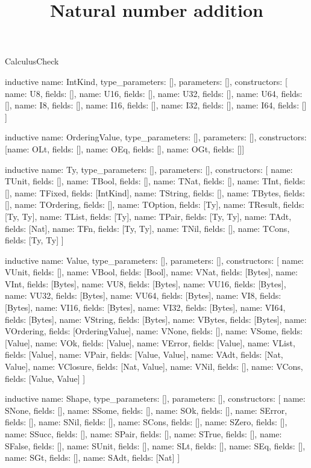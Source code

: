 \begin{lexlean}{CalculusCheck}
\title{Natural number addition}
\begin{semanticmodule}
inductive{
  name: IntKind,
  type_parameters: [],
  parameters: [],
  constructors: [
    {name: U8, fields: []},
    {name: U16, fields: []},
    {name: U32, fields: []},
    {name: U64, fields: []},
    {name: I8, fields: []},
    {name: I16, fields: []},
    {name: I32, fields: []},
    {name: I64, fields: []}
  ]
}

inductive{
  name: OrderingValue,
  type_parameters: [],
  parameters: [],
  constructors: [{name: OLt, fields: []}, {name: OEq, fields: []}, {name: OGt, fields: []}]
}

inductive{
  name: Ty,
  type_parameters: [],
  parameters: [],
  constructors: [
    {name: TUnit, fields: []},
    {name: TBool, fields: []},
    {name: TNat, fields: []},
    {name: TInt, fields: []},
    {name: TFixed, fields: [IntKind]},
    {name: TString, fields: []},
    {name: TBytes, fields: []},
    {name: TOrdering, fields: []},
    {name: TOption, fields: [Ty]},
    {name: TResult, fields: [Ty, Ty]},
    {name: TList, fields: [Ty]},
    {name: TPair, fields: [Ty, Ty]},
    {name: TAdt, fields: [Nat]},
    {name: TFn, fields: [Ty, Ty]},
    {name: TNil, fields: []},
    {name: TCons, fields: [Ty, Ty]}
  ]
}

inductive{
  name: Value,
  type_parameters: [],
  parameters: [],
  constructors: [
    {name: VUnit, fields: []},
    {name: VBool, fields: [Bool]},
    {name: VNat, fields: [Bytes]},
    {name: VInt, fields: [Bytes]},
    {name: VU8, fields: [Bytes]},
    {name: VU16, fields: [Bytes]},
    {name: VU32, fields: [Bytes]},
    {name: VU64, fields: [Bytes]},
    {name: VI8, fields: [Bytes]},
    {name: VI16, fields: [Bytes]},
    {name: VI32, fields: [Bytes]},
    {name: VI64, fields: [Bytes]},
    {name: VString, fields: [Bytes]},
    {name: VBytes, fields: [Bytes]},
    {name: VOrdering, fields: [OrderingValue]},
    {name: VNone, fields: []},
    {name: VSome, fields: [Value]},
    {name: VOk, fields: [Value]},
    {name: VError, fields: [Value]},
    {name: VList, fields: [Value]},
    {name: VPair, fields: [Value, Value]},
    {name: VAdt, fields: [Nat, Value]},
    {name: VClosure, fields: [Nat, Value]},
    {name: VNil, fields: []},
    {name: VCons, fields: [Value, Value]}
  ]
}

inductive{
  name: Shape,
  type_parameters: [],
  parameters: [],
  constructors: [
    {name: SNone, fields: []},
    {name: SSome, fields: []},
    {name: SOk, fields: []},
    {name: SError, fields: []},
    {name: SNil, fields: []},
    {name: SCons, fields: []},
    {name: SZero, fields: []},
    {name: SSucc, fields: []},
    {name: SPair, fields: []},
    {name: STrue, fields: []},
    {name: SFalse, fields: []},
    {name: SUnit, fields: []},
    {name: SLt, fields: []},
    {name: SEq, fields: []},
    {name: SGt, fields: []},
    {name: SAdt, fields: [Nat]}
  ]
}


\end{semanticmodule}
\end{lexlean}
